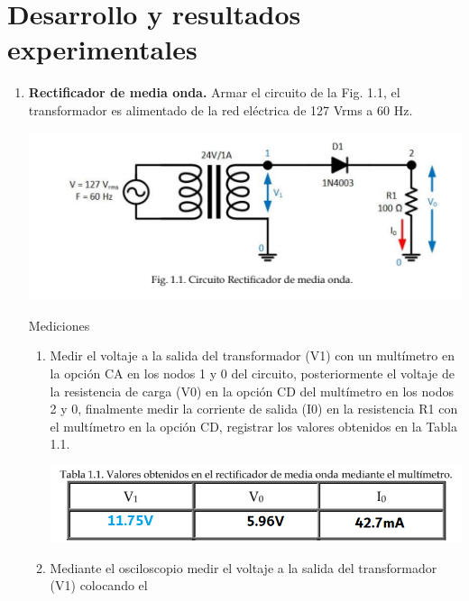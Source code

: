 \documentclass[12pt]{article}
\begin{document}
        \section*{Desarrollo y resultados experimentales}
        \label{sec:desarrollo}
        \begin{enumerate}
            \item\textbf{Rectificador de media onda.}
            Armar el circuito de la Fig. 1.1, el transformador es alimentado de la red eléctrica de 127 Vrms a 60
            Hz.\par
            \begin{center}
                \includegraphics*[]{fig1-1.png}
            \end{center}
            Mediciones\par
            \begin{enumerate}
                \item Medir el voltaje a la salida del transformador (V1) con un multímetro en la opción CA en
                los nodos 1 y 0 del circuito, posteriormente el voltaje de la resistencia de carga (V0) en la
                opción CD del multímetro en los nodos 2 y 0, finalmente medir la corriente de salida (I0)
                en la resistencia R1 con el multímetro en la opción CD, registrar los valores obtenidos en la
                Tabla 1.1.\par
                \begin{center}
                    \includegraphics*[scale=0.55]{tabla1-1.png}
                \end{center}
                \item Mediante el osciloscopio medir el voltaje a la salida del transformador (V1) colocando el

\end{enumerate}
\end{enumerate}
\end{document}
